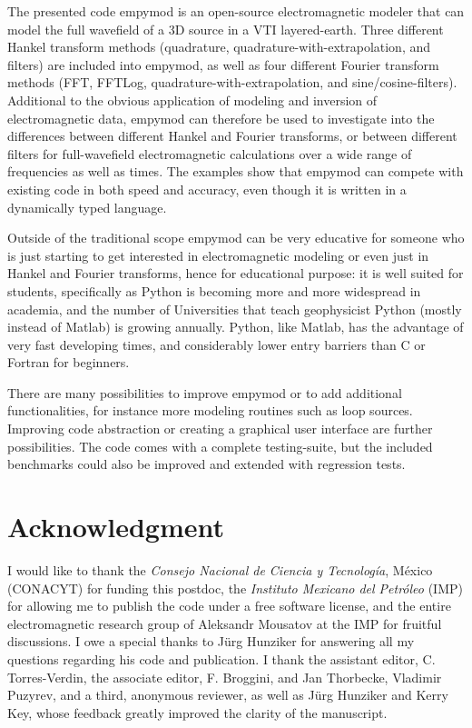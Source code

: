 \documentclass[manuscript,revised]{geophysics}
\begin{document}
The presented code empymod is an open-source electromagnetic modeler that can
model the full wavefield of a 3D source in a VTI layered-earth. Three different
Hankel transform methods (quadrature, quadrature-with-extrapolation, and
filters) are included into empymod, as well as four different Fourier transform
methods (FFT, FFTLog, quadrature-with-extrapolation, and sine/cosine-filters).
Additional to the obvious application of modeling and inversion of
electromagnetic data, empymod can therefore be used to investigate into the
differences between different Hankel and Fourier transforms, or between
different filters for full-wavefield electromagnetic calculations over a wide
range of frequencies as well as times. The examples show that empymod can
compete with existing code in both speed and accuracy, even though it is
written in a dynamically typed language.

Outside of the traditional scope empymod can be very educative for someone who
is just starting to get interested in electromagnetic modeling or even just in
Hankel and Fourier transforms, hence for educational purpose: it is well suited
for students, specifically as Python is becoming more and more widespread in
academia, and the number of Universities that teach geophysicist Python (mostly
instead of Matlab) is growing annually. Python, like Matlab, has the advantage
of very fast developing times, and considerably lower entry barriers than C or
Fortran for beginners.

There are many possibilities to improve empymod or to add additional
functionalities, for instance more modeling routines such as loop sources.
Improving code abstraction or creating a graphical user interface are further
possibilities. The code comes with a complete testing-suite, but the included
benchmarks could also be improved and extended with regression tests.


\section{Acknowledgment}

I would like to thank the \emph{Consejo Nacional de Ciencia y Tecnología},
México (CONACYT) for funding this postdoc, the \emph{Instituto Mexicano del
Petróleo} (IMP) for allowing me to publish the code under a free software
license, and the entire electromagnetic research group of Aleksandr Mousatov at
the IMP for fruitful discussions. I owe a special thanks to Jürg Hunziker for
answering all my questions regarding his code and publication. I thank the
assistant editor, C. Torres-Verdin, the associate editor, F. Broggini, and Jan
Thorbecke, Vladimir Puzyrev, and a third, anonymous reviewer, as well as Jürg
Hunziker and Kerry Key, whose feedback greatly improved the clarity of the
manuscript.
\end{document}
